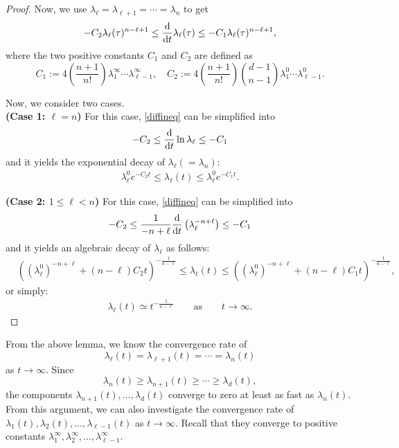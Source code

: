 \documentclass[11pt,reqno]{amsart}
\numberwithin{figure}{section}
\def\d {{\partial}}
\def\d{\mathrm{d}}
\newcommand{\dm}{d}
\renewcommand{\d}{  {\textup{d}} }
\begin{document}
\begin{proof}
Now, we use $\lambda_{\ell}=\lambda_{\ell+1}=\cdots=\lambda_n$ to get
\begin{align}\label{diffineq}
-C_2\lambda_{\ell}(\tau)^{n-\ell+1}\leq\frac{\d}{\d t}\lambda_{\ell}(\tau)\leq-C_1\lambda_{\ell}(\tau)^{n-\ell+1},
\end{align}
where the two positive constants $C_1$ and $C_2$ are defined as
\[
C_1:=4\left(\frac{n+1}{n!}\right)\lambda_1^\infty\cdots\lambda_{\ell-1}^\infty,\quad
C_2:=4\left(\frac{n+1}{n!}\right){\dm-1\choose n-1}\lambda_1^0\cdots\lambda_{\ell-1}^0.
\]

Now, we consider two cases.\\

\noindent\textbf{(Case 1: $\ell=n$)} For this case, \eqref{diffineq} can be simplified into
\[
-C_2\leq \frac{\d}{\d t}\ln \lambda_{\ell}\leq -C_1
\]
and it yields the exponential decay of $\lambda_{\ell}(=\lambda_n)$:
\begin{align}\label{eq:exponential}
\lambda_{\ell}^0e^{-C_2t}\leq \lambda_{\ell}(t)\leq \lambda_{\ell}^0e^{-C_1t}.
\end{align}


\noindent\textbf{(Case 2: $1\leq \ell<n$)} For this case, \eqref{diffineq} can be simplified into
\[
-C_2\leq\frac{1}{-n+\ell}\frac{\d}{\d t}\left(\lambda_{\ell}^{-n+\ell}\right)\leq -C_1
\]
and it yields an algebraic decay of $\lambda_{\ell}$ as follows:
\begin{align*}
&\left((\lambda_{\ell}^0)^{-n+\ell}+(n-\ell)C_2t\right)^{-\frac{1}{n-\ell}}
\leq\lambda_{\ell}(t)\leq \left((\lambda_{\ell}^0)^{-n+\ell}+(n-\ell)C_1t\right)^{-\frac{1}{n-\ell}},
\end{align*}
or simply:
\begin{align}\label{lambdal-alg-decay}
\lambda_{\ell}(t)\simeq t^{-\frac{1}{n-\ell}}
\qquad \text{as}\qquad t\to\infty.
\end{align}
\end{proof}


From the above lemma, we know the convergence rate of
\[
\lambda_{\ell}(t)=\lambda_{\ell+1}(t)=\cdots=\lambda_n(t)
\]
as $t\to\infty$. Since
\[
\lambda_n(t)\geq \lambda_{n+1}(t)\geq\cdots\geq\lambda_\dm(t),
\]
the components $\lambda_{n+1}(t),\dots,\lambda_\dm(t)$ converge to zero at least as fast as $\lambda_n(t)$. From this argument, we can also investigate the convergence rate of $\lambda_1(t), \lambda_2(t), \dots, \lambda_{\ell-1}(t)$ as $t\to\infty$. Recall that they converge to positive constants $\lambda_1^\infty,\lambda_2^\infty, \dots, \lambda_{\ell-1}^\infty$.
\end{document}
